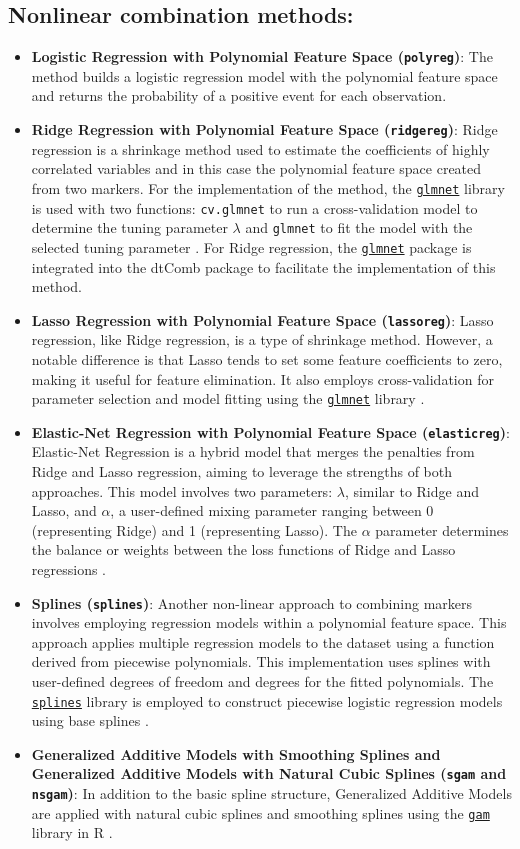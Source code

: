 \documentclass[10pt]{article}
\newcommand{\CRANpkg}[1]{\href{https://CRAN.R-project.org/package=#1}{\texttt{#1}}}
\newcommand{\Rfunction}[1]{\texttt{#1}}
\begin{document}
\subsection{Nonlinear combination methods:}
\begin{itemize}
  \item \textbf{Logistic Regression with Polynomial Feature Space (\texttt{polyreg})}: The method builds a logistic regression model with the polynomial feature space and returns the probability of a positive event for each observation.
 \item \textbf{Ridge Regression with Polynomial Feature Space (\texttt{ridgereg})}: Ridge regression is a shrinkage method used to estimate the coefficients of highly correlated variables and in this case the polynomial feature space created from two markers. For the implementation of the method, the \CRANpkg{glmnet} library is used with two functions: \Rfunction{cv.glmnet} to run a cross-validation model to determine the tuning parameter $\lambda$ and \Rfunction{glmnet} to fit the model with the selected tuning parameter \citep{friedman2010regularization}. For Ridge regression, the \CRANpkg{glmnet} package is integrated into the dtComb package to facilitate the implementation of this method.
  \item \textbf{Lasso Regression with Polynomial Feature Space (\texttt{lassoreg})}: Lasso regression, like Ridge regression, is a type of shrinkage method. However, a notable difference is that Lasso tends to set some feature coefficients to zero, making it useful for feature elimination. It also employs cross-validation for parameter selection and model fitting using the \CRANpkg{glmnet} library \citep{friedman2010regularization}.
  \item \textbf{Elastic-Net Regression with Polynomial Feature Space (\texttt{elasticreg})}: Elastic-Net Regression is a hybrid model that merges the penalties from Ridge and Lasso regression, aiming to leverage the strengths of both approaches. This model involves two parameters: $\lambda$, similar to Ridge and Lasso, and $\alpha$, a user-defined mixing parameter ranging between 0 (representing Ridge) and 1 (representing Lasso). The $\alpha$ parameter determines the balance or weights between the loss functions of Ridge and Lasso regressions \citep{friedman2010regularization}.
  \item \textbf{Splines (\texttt{splines})}: Another non-linear approach to combining markers involves employing regression models within a polynomial feature space. This approach applies multiple regression models to the dataset using a function derived from piecewise polynomials. This implementation uses splines with user-defined degrees of freedom and degrees for the fitted polynomials. The \CRANpkg{splines} library is employed to construct piecewise logistic regression models using base splines \citep{team2013r}.
  \item \textbf{Generalized Additive Models with Smoothing Splines and Generalized Additive Models with Natural Cubic Splines (\texttt{sgam} and \texttt{nsgam})}: In addition to the basic spline structure, Generalized Additive Models are applied with natural cubic splines and smoothing splines using the \CRANpkg{gam} library in R \citep{hastie2019gam}.
\end{itemize}
\end{document}
